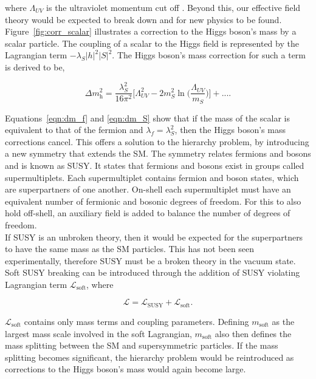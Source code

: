 where \(\Lambda_{UV}\) is the ultraviolet momentum cut off \cite{SUSY_Primer}.
Beyond this, our effective field theory would be expected to break down and for new physics to be found. \\

Figure~\ref{fig:corr_scalar} illustrates a correction to the Higgs boson's mass by a scalar particle. 
The coupling of a scalar to the Higgs field is represented by the Lagrangian term $-\lambda_S |h|^2 |S|^2$. 
The Higgs boson's mass correction for such a term is derived to be,

\begin{equation}
    \Delta m_{\text{h}}^{2} =  \frac{\lambda_{S}^{2}}{16\pi^2}\Big[\Lambda_{UV}^{2} -2m_{S}^{2} \ln\Big(\frac{\Lambda_{UV}}{m_S}\Big) \Big] + ... .
    \label{eqn:dm_S}
\end{equation}

Equations~\ref{eqn:dm_f} and \ref{eqn:dm_S} show that if the mass of the scalar is equivalent to that of the fermion and $\lambda_f = \lambda_{S}^{2}$, then the Higgs boson's mass corrections cancel. 
This offers a solution to the hierarchy problem, by introducing a new symmetry that extends the \ac{SM}. 
The symmetry relates fermions and bosons and is known as \ac{SUSY}. 
It states that fermions and bosons exist in groups called supermultiplets. 
Each supermultiplet contains fermion and boson states, which are superpartners of one another. 
On-shell each supermultiplet must have an equivalent number of fermionic and bosonic degrees of freedom. 
For this to also hold off-shell, an auxiliary field is added to balance the number of degrees of freedom. \\

If \ac{SUSY} is an unbroken theory, then it would be expected for the superpartners to have the same mass as the \ac{SM} particles. 
This has not been seen experimentally, therefore \ac{SUSY} must be a broken theory in the vacuum state. 
Soft \ac{SUSY} breaking can be introduced through the addition of \ac{SUSY} violating Lagrangian term $\mathcal{L}_{\text{soft}}$, where

\begin{equation}
    \mathcal{L} = \mathcal{L}_{\text{SUSY}} + \mathcal{L}_{\text{soft}}.
\end{equation}

$\mathcal{L}_{\text{soft}}$ contains only mass terms and coupling parameters. 
Defining $m_{\text{soft}}$ as the largest mass scale involved in the soft Lagrangian, $m_{\text{soft}}$ also then defines the mass splitting between the \ac{SM} and supersymmetric particles. 
If the mass splitting becomes significant, the hierarchy problem would be reintroduced as corrections to the Higgs boson's mass would again become large. \\

